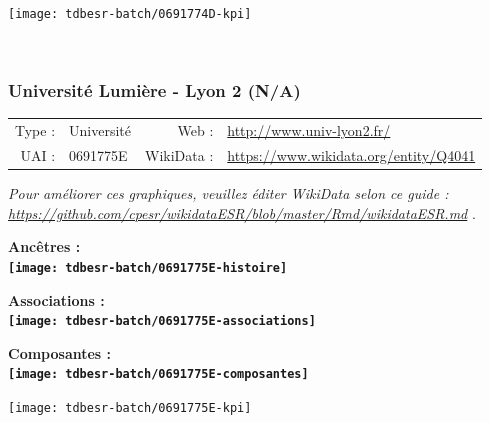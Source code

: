\documentclass[12pt,french,]{article}
\begin{document}
\begin{center}\texttt{[image: tdbesr-batch/0691774D-kpi]} \end{center}\checkoddpage

\ifoddpage \fi ~\newpage  

\hypertarget{universituxe9-lumiuxe8re---lyon-2-na}{%
\subsubsection{Université Lumière - Lyon 2
(N/A)}\label{universituxe9-lumiuxe8re---lyon-2-na}}

\begin{tabular*}{\textwidth}{rp{5cm}rl}  
\hline  
Type : & Université & Web : &\href{http://www.univ-lyon2.fr/}{http://www.univ-lyon2.fr/} \\  
UAI : & 0691775E & WikiData : & \href{https://www.wikidata.org/entity/Q4041}{https://www.wikidata.org/entity/Q4041} \\  
\hline  
\end{tabular*}

\textit{\scriptsize Pour améliorer ces graphiques, veuillez éditer WikiData selon ce guide :  \href{https://github.com/cpesr/wikidataESR/blob/master/Rmd/wikidataESR.md}{https://github.com/cpesr/wikidataESR/blob/master/Rmd/wikidataESR.md}}
.

\vspace{1cm}  
\begin{minipage}[b]{0.50\textwidth}\begin{center} \bf Ancêtres : \\  
\texttt{[image: tdbesr-batch/0691775E-histoire]} \end{center}\end{minipage}\begin{minipage}[b]{0.50\textwidth}\begin{center} \bf Associations : \\  
\texttt{[image: tdbesr-batch/0691775E-associations]} \end{center}\end{minipage}

\hrulefill

\begin{center} \bf Composantes : \\  
\texttt{[image: tdbesr-batch/0691775E-composantes]} \end{center}

\begin{center}\texttt{[image: tdbesr-batch/0691775E-kpi]} \end{center}\checkoddpage
\end{document}

